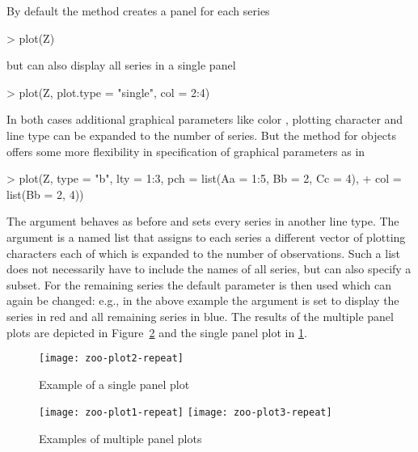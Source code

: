 \documentclass{Z}
\begin{document}
By default the  method creates a panel for each series
\begin{Schunk}
\begin{Sinput}
> plot(Z)
\end{Sinput}
\end{Schunk}
but can also display all series in a single panel
\begin{Schunk}
\begin{Sinput}
> plot(Z, plot.type = "single", col = 2:4)
\end{Sinput}
\end{Schunk}
In both cases additional graphical parameters like color ,
plotting character  and line type  can be
expanded to the number of series. But the  method for
 objects offers some more flexibility in specification
of graphical parameters as in
\begin{Schunk}
\begin{Sinput}
> plot(Z, type = "b", lty = 1:3, pch = list(Aa = 1:5, Bb = 2, Cc = 4), 
+     col = list(Bb = 2, 4))
\end{Sinput}
\end{Schunk}
The argument  behaves as before and sets every series in another
line type. The  argument is a named list that assigns to each series
a different vector of plotting characters each of which is expanded to the 
number of observations. Such a list does not necessarily have to include the names of all
series, but can also specify a subset. For the remaining series the default parameter
is then used which can again be changed: e.g., in the above example the  argument
is set to display the series  in red and all remaining series in blue.
The results of the multiple panel plots are depicted in Figure~\ref{fig:plot13} and the
single panel plot in \ref{fig:plot2}.

\begin{figure}[tbh]
\begin{center}
\texttt{[image: zoo-plot2-repeat]}
\caption{\label{fig:plot2} Example of a single panel plot}
\end{center}
\end{figure}


\begin{figure}[p]
\begin{center}
\texttt{[image: zoo-plot1-repeat]}
\texttt{[image: zoo-plot3-repeat]}
\caption{\label{fig:plot13} Examples of multiple panel plots}
\end{center}
\end{figure}
\end{document}
